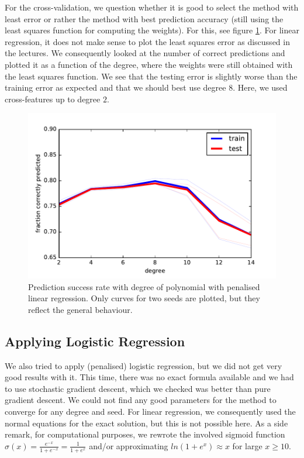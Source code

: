 \documentclass[10pt,conference,compsocconf]{IEEEtran}
\begin{document}
For the cross-validation, we question whether it is good to select the method with least error or rather the method with best prediction accuracy (still using the least squares function for computing the weights). For this, see figure \ref{fig:testing_success_rate}. For linear regression, it does not make sense to plot the least squares error as discussed in the lectures. We consequently looked at the number of correct predictions and plotted it as a function of the degree, where the weights were still obtained with the least squares function. We see that the testing error is slightly worse than the training error as expected and that we should best use degree 8. Here, we used cross-features up to degree $2$.
\begin{figure}[tbp]
  \centering
  \includegraphics[width=\columnwidth]{Images/training_testing_success_rate.pdf}
  \caption{Prediction success rate with degree of polynomial with penalised linear regression. Only curves for two seeds are plotted, but they reflect the general behaviour.}
  \vspace{-3mm}
  \label{fig:testing_success_rate}
\end{figure}


\subsection{Applying Logistic Regression}
We also tried to apply (penalised) logistic regression, but we did not get very good results with it. This time, there was no exact formula available and we had to use stochastic gradient descent, which we checked was better than pure gradient descent. We could not find any good parameters for the method to converge for any degree and seed. For linear regression, we consequently used the normal equations for the exact solution, but this is not possible here. As a side remark, for computational purposes, we rewrote the involved sigmoid function $\sigma(x) = \frac{e^{-x}}{1+e^{-x}} = \frac{1}{1+e^{x}}$ and/or approximating $ln(1+e^x)\approx x$ for large $x \geq 10$.
\end{document}
